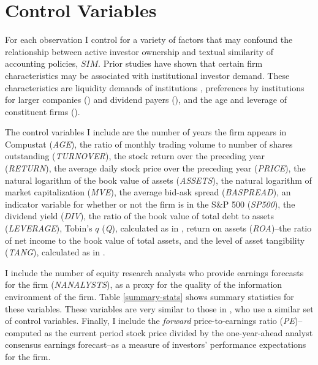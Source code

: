 \documentclass[thesis]{thesis-umich}
\begin{document}
\section{Control Variables} \label{sec:controls}
For each observation I control for a variety of factors that may confound the relationship between active investor ownership and textual similarity of accounting policies, $SIM$. Prior studies have shown that certain firm characteristics may be associated with institutional investor demand. These characteristics are liquidity demands of institutions \cite{falkenstein1996, ferreiramatos2008, huang2009}, preferences by institutions for larger companies (\cite{gompersmetrick2001}) and dividend payers (\cite{grinsteinmichaely2005}), and the age and leverage of constituent firms (\cite{badrinathetal1996}). 

The control variables I include are the number of years the firm appears in Compustat (\emph{AGE}), the ratio of monthly trading volume to number of shares outstanding 
(\emph{TURNOVER}), the stock return over the preceding year 
(\emph{RETURN}), the average daily stock price over the preceding year 
(\emph{PRICE}), the natural logarithm of the book value of assets 
(\emph{ASSETS}), the natural logarithm of market capitalization 
(\emph{MVE}), the average bid-ask spread 
(\emph{BASPREAD}), an indicator variable for whether or not the firm is in the S\&P 500 
(\emph{SP500}), the dividend yield 
(\emph{DIV}), the ratio of the book value of total debt to assets 
(\emph{LEVERAGE}), Tobin's $q$ (\emph{Q}), calculated as in \cite{chungpruitt1994}, return on assets (\emph{ROA})--the ratio of net income to the book value of total assets, and the level of asset tangibility (\emph{TANG}), calculated as in \cite{almeidacampello2007}. 

I include the number of equity research analysts who provide earnings forecasts for the firm (\emph{NANALYSTS}), as a proxy for the quality of the information environment of the firm. Table \ref{summary-stats} shows summary statistics for these variables. These variables are very similar to those in \cite{chungzhang2011}, who use a similar set of control variables. Finally, I include the \emph{forward} price-to-earnings ratio (\emph{PE})--computed as the current period stock price divided by the one-year-ahead analyst consensus earnings forecast--as a measure of investors' performance expectations for the firm.

\end{document}
